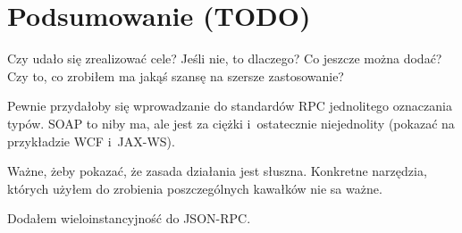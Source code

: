 \chapter{Podsumowanie (TODO)}
Czy udało się zrealizować cele? Jeśli nie, to dlaczego? Co jeszcze można dodać? Czy to, co zrobiłem ma jakąś szansę na szersze zastosowanie?

Pewnie przydałoby się wprowadzanie do standardów RPC jednolitego oznaczania typów. SOAP to niby ma, ale jest za ciężki i~ostatecznie niejednolity (pokazać na przykładzie WCF i~JAX-WS).

Ważne, żeby pokazać, że zasada działania jest słuszna. Konkretne narzędzia, których użyłem do zrobienia poszczególnych kawałków nie sa ważne.

Dodałem wieloinstancyjność do JSON-RPC.

%


